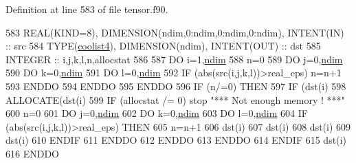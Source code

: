 Definition at line 583 of file tensor.\+f90.


\begin{DoxyCode}
583     \textcolor{keywordtype}{REAL(KIND=8)}, \textcolor{keywordtype}{DIMENSION(ndim,0:ndim,0:ndim,0:ndim)}, \textcolor{keywordtype}{INTENT(IN)} :: src
584     \textcolor{keywordtype}{TYPE}(\hyperlink{structtensor_1_1coolist4}{coolist4}), \textcolor{keywordtype}{DIMENSION(ndim)}, \textcolor{keywordtype}{INTENT(OUT)} :: dst
585     \textcolor{keywordtype}{INTEGER} :: i,j,k,l,n,allocstat
586     
587     \textcolor{keywordflow}{DO} i=1,\hyperlink{namespaceparams_a2323fe1773f086e20c14f266351c482b}{ndim}
588        n=0
589        \textcolor{keywordflow}{DO} j=0,\hyperlink{namespaceparams_a2323fe1773f086e20c14f266351c482b}{ndim}
590           \textcolor{keywordflow}{DO} k=0,\hyperlink{namespaceparams_a2323fe1773f086e20c14f266351c482b}{ndim}
591              \textcolor{keywordflow}{DO} l=0,\hyperlink{namespaceparams_a2323fe1773f086e20c14f266351c482b}{ndim}
592                 \textcolor{keywordflow}{IF} (abs(src(i,j,k,l))>real\_eps) n=n+1
593 \textcolor{keywordflow}{             ENDDO}
594 \textcolor{keywordflow}{          ENDDO}
595 \textcolor{keywordflow}{       ENDDO}
596        \textcolor{keywordflow}{IF} (n/=0) \textcolor{keywordflow}{THEN}
597           \textcolor{keywordflow}{IF} (dst(i)%
598           \textcolor{keyword}{ALLOCATE}(dst(i)%
599           \textcolor{keywordflow}{IF} (allocstat /= 0) stop \textcolor{stringliteral}{"*** Not enough memory ! ***"}
600           n=0
601           \textcolor{keywordflow}{DO} j=0,\hyperlink{namespaceparams_a2323fe1773f086e20c14f266351c482b}{ndim}
602              \textcolor{keywordflow}{DO} k=0,\hyperlink{namespaceparams_a2323fe1773f086e20c14f266351c482b}{ndim}
603                 \textcolor{keywordflow}{DO} l=0,\hyperlink{namespaceparams_a2323fe1773f086e20c14f266351c482b}{ndim}
604                    \textcolor{keywordflow}{IF} (abs(src(i,j,k,l))>real\_eps) \textcolor{keywordflow}{THEN}
605                       n=n+1
606                       dst(i)%
607                       dst(i)%
608                       dst(i)%
609                       dst(i)%
610 \textcolor{keywordflow}{                   ENDIF}
611 \textcolor{keywordflow}{                ENDDO}
612 \textcolor{keywordflow}{             ENDDO}
613 \textcolor{keywordflow}{          ENDDO}
614 \textcolor{keywordflow}{       ENDIF}
615        dst(i)%
616 \textcolor{keywordflow}{    ENDDO}
\end{DoxyCode}
